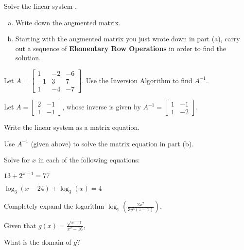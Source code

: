 \documentclass[12pt,legalpaper]{exam}
\newcommand{\MATRIX}[2]{\ensuremath{\left[\begin{array}{#1}#2\end{array}\right]}}
\newcommand{\ds}{\displaystyle}
\newcommand{\vsp}{\vspace{0.5cm}}
\begin{document}
\begin{questions}
\question[6] Solve the linear system .
\begin{enumerate}[(a)]
\item Write down the augmented matrix.
\vspace{4cm}

\item Starting with the augmented matrix you just wrote down in part (a), carry out a sequence of \textbf{Elementary Row Operations} in order to find the solution.
\end{enumerate}
\newpage

\question[4] Let $A = \MATRIX{rrr}{1 & -2 & -6\\-1 & 3 & 7\\1 & -4 & -7}$.  Use the Inversion Algorithm to find $A^{-1}$.
\newpage

\question[6] Let $A = \MATRIX{rrr}{2 & -1\\1 & -1}$, whose inverse is given by $A^{-1} = \MATRIX{rrr}{1 & -1\\1 & -2}$.
\vsp

\begin{compactenum}[(a)]
\item Write the linear system
 as a matrix equation.
\vspace{6cm}

\item Use $A^{-1}$ (given above) to solve the matrix equation in part (b).
\end{compactenum}
\newpage

\question[4] Solve for $x$ in each of the following equations:
\begin{compactenum}[(a)]
\item $13 + 2^{x+1} = 77$
\vspace{8cm}

\item $\log_{3}(x-24) + \log_{3}(x) = 4$
\vspace{8cm}
\end{compactenum}

\question[3] Completely expand the logarithm $\ds{\log_{7}\left(\frac{2x^2}{3y^3(z-1)}\right)}$.
\newpage

\question[3] Given that $\ds{g(x) = \frac{\sqrt{x-1}}{x^2 - 16}}$,
\begin{compactenum}[(a)]
\item What is the domain of $g$?
\vspace{5cm}


\end{compactenum}
\end{questions}
\end{document}
